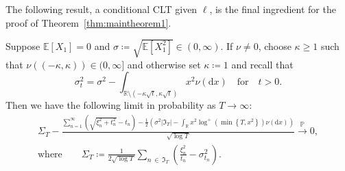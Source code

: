 \documentclass[10pt]{amsart}
\theoremstyle{definition}\newtheorem{defi}[theo]{Definition}\newtheorem{rema}[theo]{Remark}\newtheorem{exam}[theo]{Example}\newtheorem{exem}[theo]{Example}\newtheorem{nota}[theo]{Notation}
\newcommand\R{\mathbb{R}}
\newcommand\E{\mathds{E}}
\newcommand\p{\mathds{P}}
\newcommand\1{\mathds{1}}
\newcommand\D{\mathrm{d}}
\newcommand\GI{\mathfrak{I}}
\newcommand\cip{\xrightarrow{\p}}
\begin{document}
The following result, a conditional CLT given $\ell$, is the final ingredient for the proof of Theorem~\ref{thm:maintheorem1}.

\begin{prop}\label{prop:Upsilon-approx}
Suppose $\E[X_1]=0$ and $\sigma\coloneqq \sqrt{\E[X_1^2]}\in(0,\infty)$. If $\nu\ne0$, choose $\kappa\geq1$ such that $\nu((-\kappa,\kappa))\in(0,\infty]$ and otherwise set $\kappa\coloneqq 1$ and recall that
\[
\sigma_t^2=\sigma^2 -\int_{\R\setminus\left(-\kappa\sqrt{t},\kappa\sqrt{t}\right)} x^2\nu(\D x)\quad\text{for}\quad t>0.
\]
Then we have the following limit in probability as $T\to\infty$:
\begin{multline}\label{eq:Upsilon-approx}
\Sigma_T -\frac{\sum\limits_{n=1}^\infty \left(\sqrt{\xi_n^2+t_n^2}-t_n\right) -\frac{1}{2}\left(\sigma^2|\GI_T| -\int_\R x^2\log^+\left(\min\left\{T, x^2\right\}\right)\nu(\D x)\right)}{\sqrt{\log T}}
\cip 0,\\
\text{where}\qquad\Sigma_T\coloneqq
\frac{1}{2\sqrt{\log T}}\sum_{n\,\in\,\GI_T}
\left(\frac{\xi_n^2}{t_n}-\sigma_{t_n}^2\right).
\end{multline}
\end{prop}
\end{document}
